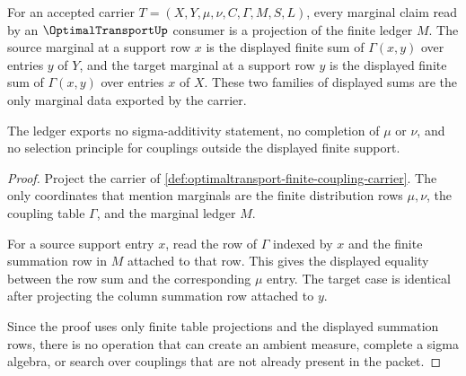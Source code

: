 \begin{theorem}
\label{thm:optimaltransport-coupling-marginal-ledger}
For an accepted carrier $T=(X,Y,\mu,\nu,C,\Gamma,M,S,L)$, every marginal claim read by an $\OptimalTransportUp$ consumer is a projection of the finite ledger $M$. The source marginal at a support row $x$ is the displayed finite sum of $\Gamma(x,y)$ over entries $y$ of $Y$, and the target marginal at a support row $y$ is the displayed finite sum of $\Gamma(x,y)$ over entries $x$ of $X$. These two families of displayed sums are the only marginal data exported by the carrier.

The ledger exports no sigma-additivity statement, no completion of $\mu$ or $\nu$, and no selection principle for couplings outside the displayed finite support.
\end{theorem}
\begin{proof}
Project the carrier of \autoref{def:optimaltransport-finite-coupling-carrier}. The only coordinates that mention marginals are the finite distribution rows $\mu,\nu$, the coupling table $\Gamma$, and the marginal ledger $M$.

For a source support entry $x$, read the row of $\Gamma$ indexed by $x$ and the finite summation row in $M$ attached to that row. This gives the displayed equality between the row sum and the corresponding $\mu$ entry. The target case is identical after projecting the column summation row attached to $y$.

Since the proof uses only finite table projections and the displayed summation rows, there is no operation that can create an ambient measure, complete a sigma algebra, or search over couplings that are not already present in the packet.
\end{proof}

